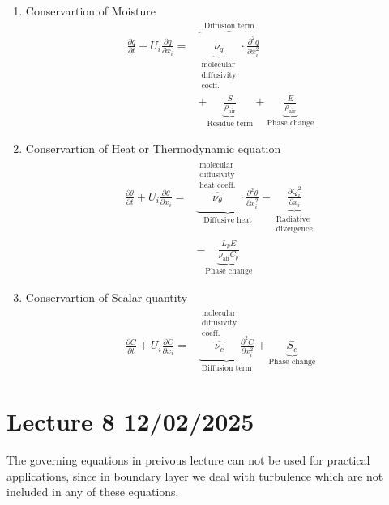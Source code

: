\documentclass[fleqn,10pt]{SelfArx} %
\begin{document}
\begin{enumerate}[noitemsep]
	\item Conservartion of Moisture
	      \begin{align*}
		      \frac{\partial q}{\partial t} + U_i\frac{\partial q}{\partial x_i} = & \overbrace{\underbrace{\nu_q}_{\substack{\text{molecular} \\ \text{diffusivity} \\ \text{coeff.}}} \cdot \frac{\partial^2 q}{\partial x_i^2}}^{\text{Diffusion term}} \\ &+ \underbrace{\frac{S}{\rho_{\text{air}}}}_{\text{Residue term}} + \underbrace{\frac{E}{\rho_{\text{air}}}}_{\text{Phase change}} \tag{7.5} \label{eq:moistureeq}
	      \end{align*}
	\item Conservartion of Heat or Thermodynamic equation
	      \begin{align*}
		      \frac{\partial \theta}{\partial t} + U_i\frac{\partial \theta}{\partial x_i} = & \underbrace{\overbrace{\nu_\theta}^{\substack{\text{molecular} \\ \text{diffusivity} \\ \text{heat coeff.}}} \cdot \frac{\partial^2 \theta}{\partial x_i^2}}_{\text{Diffusive heat}} - \underbrace{\frac{\partial Q_i^2}{\partial x_i}}_{\substack{\text{Radiative} \\ \text{divergence}}} \\ &- \underbrace{\frac{L_pE}{\rho_{\text{air}}C_p}}_{\text{Phase change}} \tag{7.6} \label{eq:heateq}
	      \end{align*}
	\item Conservartion of Scalar quantity
	      \begin{align*}
		      \frac{\partial C}{\partial t} + U_i\frac{\partial C}{\partial x_i} = & \underbrace{\overbrace{\nu_c}^{\substack{\text{molecular} \\ \text{diffusivity} \\ \text{coeff.}}} \frac{\partial^2 C}{\partial x_i^2}}_{\text{Diffusion term}} + \underbrace{S_c}_{\text{Phase change}} \tag{7.7} \label{eq:scalarquantity}
	      \end{align*}
\end{enumerate}

\clearpage

\section{Lecture 8 12/02/2025}
The governing equations in preivous lecture can not be used for practical applications, since in boundary layer we deal with turbulence which are not included in any of these equations.
\end{document}

